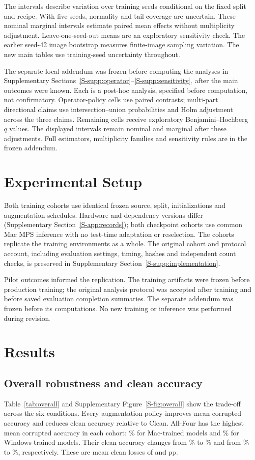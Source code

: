 \documentclass[twoside,a4paper,11pt]{article}
\newcommand{\posthoc}{post-hoc analysis, specified before computation, not confirmatory}
\begin{document}
The intervals describe variation over training seeds conditional on the fixed split and recipe. With five seeds, normality and tail coverage are uncertain. These nominal marginal intervals estimate paired mean effects without multiplicity adjustment. Leave-one-seed-out means are an exploratory sensitivity check. The earlier seed-42 image bootstrap measures finite-image sampling variation. The new main tables use training-seed uncertainty throughout.

The separate local addendum was frozen before computing the analyses in Supplementary Sections~\ref{S-supp:operator}--\ref{S-supp:sensitivity}, after the main outcomes were known. Each is a \posthoc. Operator-policy cells use paired contrasts; multi-part directional claims use intersection--union probabilities and Holm adjustment across the three claims. Remaining cells receive exploratory Benjamini--Hochberg $q$ values. The displayed intervals remain nominal and marginal after these adjustments. Full estimators, multiplicity families and sensitivity rules are in the frozen addendum.

\section{Experimental Setup}
\label{sec:cohorts}\label{sec:protocol}
Both training cohorts use identical frozen source, split, initializations and augmentation schedules. Hardware and dependency versions differ (Supplementary Section~\ref{S-app:records}); both checkpoint cohorts use common Mac MPS inference with no test-time adaptation or reselection. The cohorts replicate the training environments as a whole. The original cohort and protocol account, including evaluation settings, timing, hashes and independent count checks, is preserved in Supplementary Section~\ref{S-supp:implementation}.

Pilot outcomes informed the replication. The training artifacts were frozen before production training; the original analysis protocol was accepted after training and before saved evaluation completion summaries. The separate addendum was frozen before its computations. No new training or inference was performed during revision.

\section{Results}
\subsection{Overall robustness and clean accuracy}
\label{sec:overall}
Table~\ref{tab:overall} and Supplementary Figure~\ref{S-fig:overall} show the trade-off across the six conditions. Every augmentation policy improves mean corrupted accuracy and reduces clean accuracy relative to Clean. All-Four has the highest mean corrupted accuracy in each cohort: \AllCorruptMac{}\% for Mac-trained models and \AllCorruptWin{}\% for Windows-trained models. Their clean accuracy changes from \BaseCleanMac{}\% to \AllCleanMac{}\% and from \BaseCleanWin{}\% to \AllCleanWin{}\%, respectively. These are mean clean losses of \AllCleanCostMac{} and \AllCleanCostWin{} pp.
\end{document}
